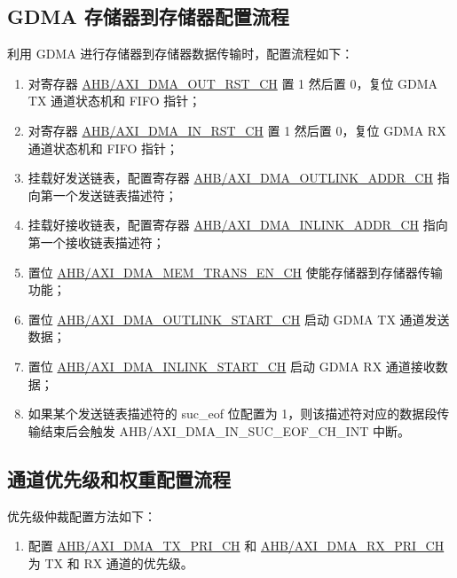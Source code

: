 \documentclass[main\_\_CN.tex]{subfiles}
\begin{document}
\subsection{GDMA 存储器到存储器配置流程}
利用 GDMA 进行存储器到存储器数据传输时，配置流程如下：
\begin{enumerate}
    \item 对寄存器 \hyperref[fielddesc:AHBDMAOUTRSTCHN]{AHB/AXI\_DMA\_OUT\_RST\_CH} 置 1 然后置 0，复位 GDMA TX 通道状态机和 FIFO 指针；
    \item 对寄存器 \hyperref[fielddesc:AHBDMAINRSTCHN]{AHB/AXI\_DMA\_IN\_RST\_CH} 置 1 然后置 0，复位 GDMA RX 通道状态机和 FIFO 指针；
    \item 挂载好发送链表，配置寄存器 \hyperref[fielddesc:AHBDMAOUTLINKADDRCHN]{AHB/AXI\_DMA\_OUTLINK\_ADDR\_CH} 指向第一个发送链表描述符；
    \item 挂载好接收链表，配置寄存器 \hyperref[fielddesc:AHBDMAINLINKADDRCHN]{AHB/AXI\_DMA\_INLINK\_ADDR\_CH} 指向第一个接收链表描述符；
    \item 置位 \hyperref[fielddesc:AHBDMAMEMTRANSENCHN]{AHB/AXI\_DMA\_MEM\_TRANS\_EN\_CH} 使能存储器到存储器传输功能；
    \item 置位 \hyperref[fielddesc:AHBDMAOUTLINKSTARTCHN]{AHB/AXI\_DMA\_OUTLINK\_START\_CH} 启动 GDMA TX 通道发送数据；
    \item 置位 \hyperref[fielddesc:AHBDMAINLINKSTARTCHN]{AHB/AXI\_DMA\_INLINK\_START\_CH} 启动 GDMA RX 通道接收数据；
    \item 如果某个发送链表描述符的 suc\_eof 位配置为 1，则该描述符对应的数据段传输结束后会触发 AHB/AXI\_DMA\_IN\_SUC\_EOF\_CH\_INT 中断。
\end{enumerate}

\subsection{通道优先级和权重配置流程}

优先级仲裁配置方法如下：
\begin{enumerate}
\item  配置 \hyperref[fielddesc:AHBDMATXPRICHN]{AHB/AXI\_DMA\_TX\_PRI\_CH} 和 \hyperref[fielddesc:AHBDMARXPRICHN]{AHB/AXI\_DMA\_RX\_PRI\_CH} 为 TX 和 RX 通道的优先级。
\end{enumerate}
\end{document}

